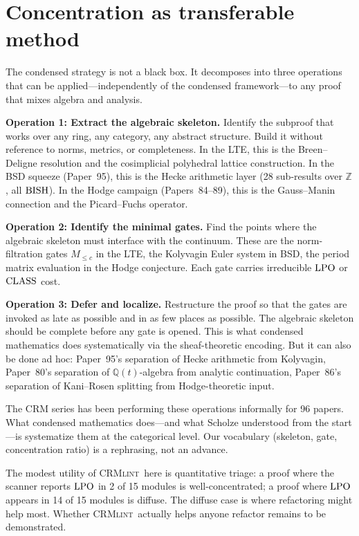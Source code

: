 \documentclass[11pt,a4paper]{article}
\theoremstyle{plain}
\theoremstyle{definition}
\newcommand{\BISH}{\textup{BISH}}
\newcommand{\LPO}{\textup{LPO}}
\newcommand{\CLASS}{\textup{CLASS}}
\newcommand{\CRMlint}{\textsc{CRMlint}}
\newcommand{\Z}{\mathbb{Z}}
\newcommand{\Q}{\mathbb{Q}}
\begin{document}
\section{Concentration as transferable method}\label{sec:transferable}

The condensed strategy is not a black box.  It decomposes into three
operations that can be applied---independently of the condensed
framework---to any proof that mixes algebra and analysis.

\medskip
\noindent\textbf{Operation 1: Extract the algebraic skeleton.}
Identify the subproof that works over any ring, any category, any
abstract structure.  Build it without reference to norms, metrics,
or completeness.  In the LTE, this is the Breen--Deligne resolution
and the cosimplicial polyhedral lattice construction.  In the BSD
squeeze (Paper~95), this is the Hecke arithmetic layer (28
sub-results over $\Z$, all $\BISH$).  In the Hodge campaign
(Papers~84--89), this is the Gauss--Manin connection and the
Picard--Fuchs operator.

\medskip
\noindent\textbf{Operation 2: Identify the minimal gates.}
Find the points where the algebraic skeleton must interface with
the continuum.  These are the norm-filtration gates $M_{\leq c}$
in the LTE, the Kolyvagin Euler system in BSD, the period matrix
evaluation in the Hodge conjecture.  Each gate carries irreducible
$\LPO$ or $\CLASS$ cost.

\medskip
\noindent\textbf{Operation 3: Defer and localize.}
Restructure the proof so that the gates are invoked as late as
possible and in as few places as possible.  The algebraic skeleton
should be complete before any gate is opened.  This is what
condensed mathematics does systematically via the sheaf-theoretic
encoding.  But it can also be done ad hoc: Paper~95's separation
of Hecke arithmetic from Kolyvagin, Paper~80's separation of
$\Q(t)$-algebra from analytic continuation, Paper~86's separation
of Kani--Rosen splitting from Hodge-theoretic input.

\medskip

The CRM series has been performing these operations informally
for 96 papers.  What condensed mathematics does---and what Scholze
understood from the start---is systematize them at the categorical
level.  Our vocabulary (skeleton, gate, concentration ratio) is a
rephrasing, not an advance.

The modest utility of \CRMlint\ here is quantitative triage:
a proof where the scanner reports $\LPO$ in 2 of 15 modules is
well-concentrated; a proof where $\LPO$ appears in 14 of 15
modules is diffuse.  The diffuse case is where refactoring might
help most.  Whether \CRMlint\ actually helps anyone refactor
remains to be demonstrated.
\end{document}
